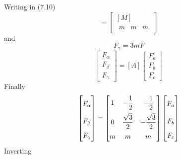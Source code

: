 \documentclass[a4paper,numbers=noenddot,12pt]{scrbook}
\begin{document}
    Writing in (7.10)
    \begin{equation*}
        [A] = 
        \begin{bmatrix}
            [M] \\
            \begin{matrix}
                m & m & m
            \end{matrix}
        \end{bmatrix}
    \end{equation*}
    and
    \begin{equation*}
        F_{\gamma} = 3 m F
    \end{equation*}
    \begin{equation}
        \begin{bmatrix}
            F_{\alpha} \\ F_{\beta} \\ F_{\gamma}
        \end{bmatrix}
        = [A]
        \begin{bmatrix}
            F_a \\ F_b \\ F_c
        \end{bmatrix}
        \label{eq:Eq7.12}
    \end{equation}
    Finally
    \begin{equation}
        \begin{bmatrix}
            F_{\alpha} \vphantom{\dfrac{1}{2}} \\[2ex]
            F_{\beta} \vphantom{\dfrac{1}{2}} \\[2ex]
            F_{\gamma} 
        \end{bmatrix}
        =
        \begin{bmatrix}
            1  & - \dfrac{1}{2} & - \dfrac{1}{2} \\[2ex]
            0 & \dfrac{\sqrt{3}}{2} & - \dfrac{\sqrt{3}}{2} \\[2ex]
            m & m & m
        \end{bmatrix}
        \begin{bmatrix}
            F_a \vphantom{\dfrac{1}{2}} \\[2ex]
            F_b \vphantom{\dfrac{1}{2}} \\[2ex]
            F_c 
        \end{bmatrix}
        \label{eq:Eq7.13}
    \end{equation}
    Inverting
\end{document}
